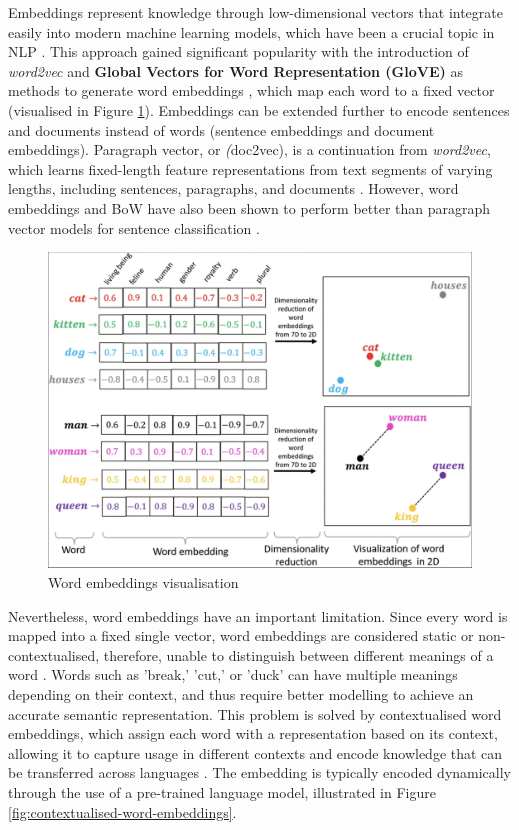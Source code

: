 Embeddings represent knowledge through low-dimensional vectors that integrate easily into modern machine learning models, which have been a crucial topic in NLP \cite{camacho-collados-2020-embeddings}. This approach gained significant popularity with the introduction of \textit{word2vec} and \textbf{Global Vectors for Word Representation (GloVE)} \cite{pennington-2014-glove} as methods to generate word embeddings \cite{mikolov-2013-embeddings}, which map each word to a fixed vector (visualised in Figure \ref{fig:word-embeddings}). Embeddings can be extended further to encode sentences and documents instead of words (sentence embeddings and document embeddings). Paragraph vector, or \textit(doc2vec), is a continuation from \textit{word2vec}, which learns fixed-length feature representations from text segments of varying lengths, including sentences, paragraphs, and documents \cite{mikolov-2014-doc2vec}. However, word embeddings and BoW have also been shown to perform better than paragraph vector models for sentence classification \cite{white-2015-how-well-sentence-embeddings}.

\begin{figure}[htbp]
    \centering
    \includegraphics[width=0.8\linewidth]{images/word_embeddings.png}
    \caption{Word embeddings visualisation \cite{narayanan-2019-word-embeddings}}
    \label{fig:word-embeddings}
\end{figure}


Nevertheless, word embeddings have an important limitation. Since every word is mapped into a fixed single vector, word embeddings are considered static or non-contextualised, therefore, unable to distinguish between different meanings of a word \cite{camacho-collados-2020-embeddings}. Words such as 'break,' 'cut,' or 'duck' can have multiple meanings depending on their context, and thus require better modelling to achieve an accurate semantic representation. This problem is solved by contextualised word embeddings, which assign each word with a representation based on its context, allowing it to capture usage in different contexts and encode knowledge that can be transferred across languages \cite{liu-2020-survey-contextual-embeddings}. The embedding is typically encoded dynamically through the use of a pre-trained language model, illustrated in Figure \ref{fig:contextualised-word-embeddings}.

